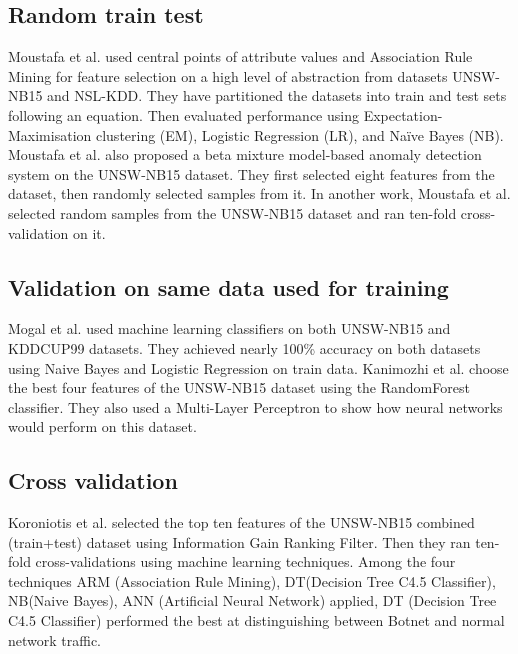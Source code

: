 \documentclass[14pt, conference]{IEEEtran}
\begin{document}
\subsection{Random train test}
Moustafa et al. \cite{moustafa2017hybrid} used central points of attribute values and Association Rule Mining for feature
selection on a high level of abstraction from datasets UNSW-NB15 and NSL-KDD. They have partitioned the datasets into train and test sets following an equation. Then evaluated performance using Expectation-Maximisation clustering (EM), Logistic Regression (LR), and Naïve Bayes (NB). 
Moustafa et al. \cite{moustafa2018anomaly} also proposed a beta mixture model-based anomaly detection system on the UNSW-NB15 dataset. They first selected eight features from the dataset,
then randomly selected samples from it. 
In another work, Moustafa et al. \cite{moustafa2019holistic} selected random samples from the UNSW-NB15 dataset and ran ten-fold cross-validation on it. %

\subsection{Validation on same data used for training}
Mogal et al.\cite{mogal2017nids} used machine learning classifiers on both UNSW-NB15 and KDDCUP99 datasets.
They achieved nearly 100\% accuracy on both datasets using Naive Bayes and Logistic Regression on train data. Kanimozhi et al. \cite{Kanimozhi2019UNSW-NB15} choose the best four features of
the UNSW-NB15 dataset using the RandomForest classifier. They also used a Multi-Layer Perceptron to show how neural
networks would perform on this dataset. 

\subsection{Cross validation}
Koroniotis et al.\cite{koroniotis2017towards} selected the top ten features of the UNSW-NB15 combined (train+test)
dataset using Information Gain Ranking Filter. Then they ran ten-fold cross-validations using machine learning techniques.
Among the four techniques ARM (Association Rule Mining), DT(Decision Tree C4.5 Classifier), NB(Naive Bayes), ANN (Artificial Neural Network) applied, DT (Decision Tree C4.5 Classifier) performed the best at distinguishing between Botnet and normal network traffic.
 
\end{document}
